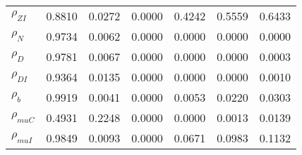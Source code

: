 \begin{center}
\begin{longtable}{lcccccc}
$ {\rho_{ZI}}          $	 & 	          0.8810	 & 	          0.0272	 & 	          0.0000	 & 	          0.4242	 & 	          0.5559	 & 	          0.6433 \\ 
$ {\rho_N}             $	 & 	          0.9734	 & 	          0.0062	 & 	          0.0000	 & 	          0.0000	 & 	          0.0000	 & 	          0.0000 \\ 
$ {\rho_D}             $	 & 	          0.9781	 & 	          0.0067	 & 	          0.0000	 & 	          0.0000	 & 	          0.0000	 & 	          0.0003 \\ 
$ {\rho_{DI}}          $	 & 	          0.9364	 & 	          0.0135	 & 	          0.0000	 & 	          0.0000	 & 	          0.0000	 & 	          0.0010 \\ 
$ {\rho_b}             $	 & 	          0.9919	 & 	          0.0041	 & 	          0.0000	 & 	          0.0053	 & 	          0.0220	 & 	          0.0303 \\ 
$ {\rho_{muC}}         $	 & 	          0.4931	 & 	          0.2248	 & 	          0.0000	 & 	          0.0000	 & 	          0.0013	 & 	          0.0139 \\ 
$ {\rho_{muI}}         $	 & 	          0.9849	 & 	          0.0093	 & 	          0.0000	 & 	          0.0671	 & 	          0.0983	 & 	          0.1132 \\ 
\end{longtable}
 \end{center}
